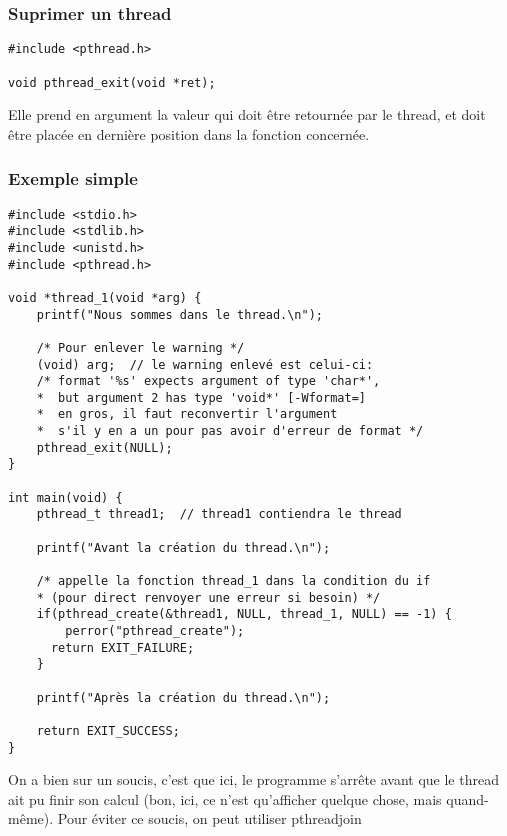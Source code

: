 \documentclass[a4paper]{article}
\begin{document}
\subsubsection{Suprimer un thread}
\begin{lstlisting}
#include <pthread.h>

void pthread_exit(void *ret);
\end{lstlisting}
Elle prend en argument la valeur qui doit être retournée par le thread, et doit être placée en dernière position dans la fonction concernée.
\newpage
\subsubsection{Exemple simple}
\begin{lstlisting}
#include <stdio.h>
#include <stdlib.h>
#include <unistd.h>
#include <pthread.h>

void *thread_1(void *arg) {
    printf("Nous sommes dans le thread.\n");

    /* Pour enlever le warning */
    (void) arg;  // le warning enlevé est celui-ci:
    /* format '%s' expects argument of type 'char*',
    *  but argument 2 has type 'void*' [-Wformat=]
    *  en gros, il faut reconvertir l'argument
    *  s'il y en a un pour pas avoir d'erreur de format */
    pthread_exit(NULL);
}

int main(void) {
    pthread_t thread1;  // thread1 contiendra le thread

    printf("Avant la création du thread.\n");

    /* appelle la fonction thread_1 dans la condition du if
    * (pour direct renvoyer une erreur si besoin) */
    if(pthread_create(&thread1, NULL, thread_1, NULL) == -1) {
	    perror("pthread_create");
      return EXIT_FAILURE;
    }

    printf("Après la création du thread.\n");

    return EXIT_SUCCESS;
}
\end{lstlisting}
On a bien sur un soucis, c'est que ici, le programme s'arrête avant que le thread ait pu finir son calcul (bon, ici, ce n'est qu'afficher quelque chose, mais quand-même). Pour éviter ce soucis, on peut utiliser \guillemotleft{} pthread\textunderscore{}join \guillemotright{}
\end{document}
